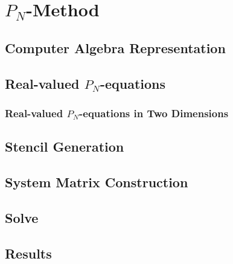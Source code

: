 \chapter{$P_N$-Method}
%
\label{sec:pnmethod}

\section{Computer Algebra Representation}
\section{Real-valued $P_N$-equations}
\subsection{Real-valued $P_N$-equations in Two Dimensions}
\section{Stencil Generation}
\section{System Matrix Construction}
\section{Solve}
\section{Results}

